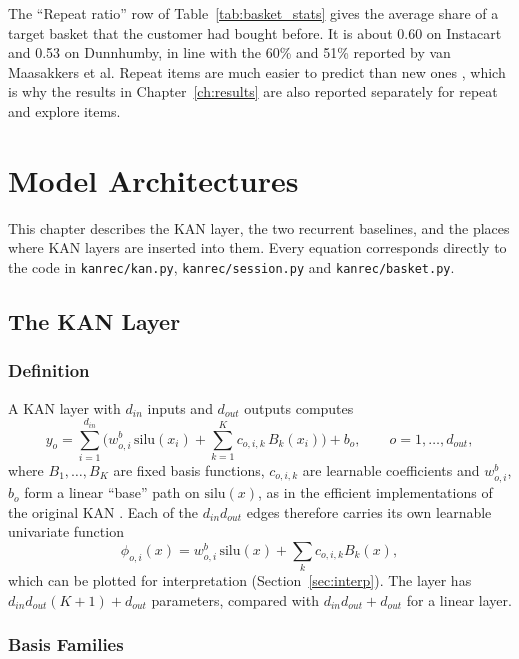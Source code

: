 \documentclass[12pt,a4paper]{report}
\begin{document}
The ``Repeat ratio'' row of Table~\ref{tab:basket_stats} gives the average share
of a target basket that the customer had bought before. It is about 0.60 on
Instacart and 0.53 on Dunnhumby, in line with the 60\% and 51\% reported by van
Maasakkers et al. Repeat items are much easier to predict than new ones
\cite{li2023}, which is why the results in Chapter~\ref{ch:results} are also
reported separately for repeat and explore items.

\chapter{Model Architectures}
\label{ch:models}

This chapter describes the KAN layer, the two recurrent baselines, and the
places where KAN layers are inserted into them. Every equation corresponds
directly to the code in \texttt{kanrec/kan.py}, \texttt{kanrec/session.py} and
\texttt{kanrec/basket.py}.

\section{The KAN Layer}

\subsection{Definition}

A KAN layer with $d_{in}$ inputs and $d_{out}$ outputs computes
\begin{equation}
y_o = \sum_{i=1}^{d_{in}} \Big( w^{b}_{o,i}\, \mathrm{silu}(x_i) + \sum_{k=1}^{K} c_{o,i,k}\, B_k(x_i) \Big) + b_o,
\qquad o = 1, \ldots, d_{out},
\label{eq:kan}
\end{equation}
where $B_1, \ldots, B_K$ are fixed basis functions, $c_{o,i,k}$ are learnable
coefficients and $w^b_{o,i}$, $b_o$ form a linear ``base'' path on
$\mathrm{silu}(x)$, as in the efficient implementations of the original KAN
\cite{liu2025kan}. Each of the $d_{in} d_{out}$ edges therefore carries its own
learnable univariate function
\begin{equation}
\phi_{o,i}(x) = w^b_{o,i}\,\mathrm{silu}(x) + \sum_{k} c_{o,i,k} B_k(x),
\end{equation}
which can be plotted for interpretation (Section~\ref{sec:interp}). The layer
has $d_{in} d_{out} (K + 1) + d_{out}$ parameters, compared with
$d_{in} d_{out} + d_{out}$ for a linear layer.

\subsection{Basis Families}
\end{document}
